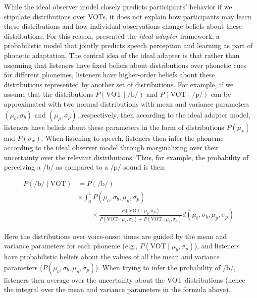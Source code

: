  While the ideal observer model closely predicts participants' behavior if we stipulate distributions over VOTs, it does not explain how participants may learn these distributions and how individual observations
 change  beliefs about these distributions. For this reason, \textcite{Kleinschmidt2015} presented the \textit{ideal adapter} framework, a probabilistic model that jointly predicts speech perception and learning
 as part of phonetic adaptation. The central idea of the ideal adapter is that rather than assuming that listeners have fixed beliefs about distributions over phonetic cues for different phonemes, listeners have higher-order
 beliefs about these distributions represented by another set of distributions. For example, if we assume that the distributions $P(\mbox{VOT}\mid \mbox{/b/})$ and $P(\mbox{VOT}\mid \mbox{/p/})$ can be approximated
 with two normal distributions with mean and variance parameters $(\mu_{b}, \sigma_{b})$ and $(\mu_{p}, \sigma_{p})$, respectively, then according to the ideal adapter model, listeners have beliefs about these parameters
 in the form of distributions $P(\mu_x)$ and $P(\sigma_x)$. When listening to speech, listeners then infer the phoneme according to the ideal observer model through marginalizing over their uncertainty over the relevant distributions.
 Thus, for example, the probability of perceiving a /b/ as compared to a /p/ sound is then:
 
\begin{align*}
  P(\mbox{/b/} \mid \mbox{VOT}) &=  P(\mbox{/b/}) \\ &  \times \int_{0}^1 P(\mu_b, \sigma_b, \mu_p, \sigma_p) \\ 
  & \qquad  \times \frac{P(\mbox{VOT}\mid \mu_b, \sigma_p)}{P(\mbox{VOT}\mid \mu_b, \sigma_b) + P(\mbox{VOT}\mid \mu_b, \sigma_p)} d (\mu_b, \sigma_b, \mu_p, \sigma_p)
\end{align*}

\noindent Here the distributions over voice-onset times are guided by the mean and variance parameters for each phoneme (e.g.,  $P(\mbox{VOT}\mid \mu_b, \sigma_p)$), and listeners
have probabilistic beliefs about the values of all the mean and variance parameters ($P(\mu_b, \sigma_b, \mu_p, \sigma_p)$). When trying to infer the probability of /b/, listeners then
average over the uncertainty about the VOT distributions (hence the integral over the mean and variance parameters in the formula above). 

